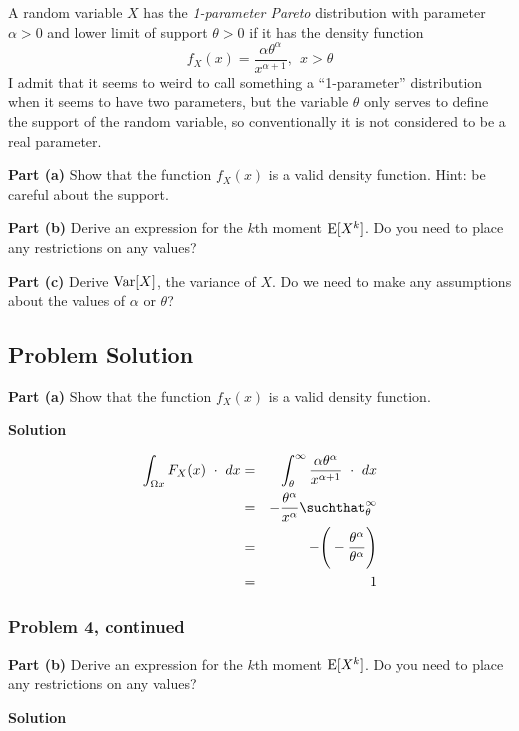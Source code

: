 \documentclass[12pt]{article}
\theoremstyle{definition}
\begin{document}
A random variable $X$ has the {\em 1-parameter Pareto} distribution with parameter $\alpha > 0$ and lower limit of support $\theta > 0$ if it has the density function
$$
f_X(x) = \frac{\alpha \theta^\alpha}{x^{\alpha + 1}},\ \ x > \theta
$$
I admit that it seems to weird to call something a ``1-parameter'' distribution when it seems to have two parameters, but the variable $\theta$ only serves to define the support of the random variable, so conventionally it is not considered to be a real parameter.

\bigskip
\noindent
{\bf Part (a)} Show that the function $f_X(x)$ is a valid density function. Hint: be careful about the support.

\bigskip
\noindent
{\bf Part (b)} Derive an expression for the $k$th moment $\hbox{E}[X^k]$. Do you need to place any restrictions on any values?

\bigskip
\noindent
{\bf Part (c)} Derive $\hbox{Var}[X]$, the variance of $X$. Do we need to make any assumptions about the values of $\alpha$ or $\theta$?


\subsection*{Problem Solution}

\bigskip
\noindent
{\bf Part (a)} Show that the function $f_X(x)$ is a valid density function.

\bigskip
\noindent
{\bf Solution}

\begin{eqnarray*}
\int_{\Omega x} F_X(x) \ \cdot \ dx & = & \int_ \theta ^ \infty \frac{\alpha \theta^\alpha}{x^{\alpha + 1}} \ \cdot \ dx \\
& = & - \frac{\theta^\alpha}{x^\alpha} \suchthat_\theta^\infty \\
& = & - \Bigg( - \frac{\theta^\alpha}{\theta^\alpha} \Bigg) \\
& = & 1
\end{eqnarray*}

\newpage
\subsubsection*{Problem 4, continued}

\vspace{in}
\noindent
{\bf Part (b)} Derive an expression for the $k$th moment $\hbox{E}[X^k]$. Do you need to place any restrictions on any values?

\bigskip
\noindent
{\bf Solution}
\end{document}
